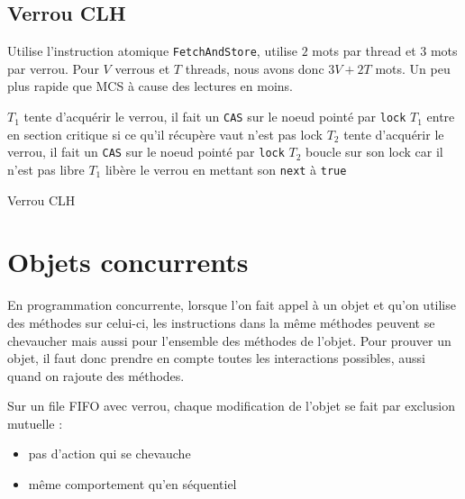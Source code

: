 \documentclass[11pt,a4paper]{report}
\begin{document}

\section{Verrou CLH} %
\label{sec:Verrou CLH}

Utilise l'instruction atomique \texttt{FetchAndStore}, utilise $2$ mots par thread et $3$ mots par verrou. Pour $V$ verrous et $T$ threads, nous avons donc $3V+2T$ mots. Un peu plus rapide que MCS à cause des lectures en moins.

\begin{algorithm}[h] %
    $T_1$ tente d'acquérir le verrou, il fait un \texttt{CAS} sur le noeud pointé par \texttt{lock}\;
    $T_1$ entre en section critique si ce qu'il récupère vaut n'est pas lock\;
    $T_2$ tente d'acquérir le verrou, il fait un \texttt{CAS} sur le noeud pointé par \texttt{lock}\;
    $T_2$ boucle sur son lock car il n'est pas libre\;
    $T_1$ libère le verrou en mettant son \texttt{next} à \texttt{true}\;
    \caption{Verrou CLH}
    \label{algo:verrou-clh}
\end{algorithm} %



\chapter{Objets concurrents} %
\label{cha:Objets concurrents}

En programmation concurrente, lorsque l'on fait appel à un objet et qu'on utilise des méthodes sur celui-ci, les instructions dans la même méthodes peuvent se chevaucher mais aussi pour l'ensemble des méthodes de l'objet. Pour prouver un objet, il faut donc prendre en compte toutes les interactions possibles, aussi quand on rajoute des méthodes.

Sur un file FIFO avec verrou, chaque modification de l'objet se fait par exclusion mutuelle :
\begin{itemize}
    \item pas d'action qui se chevauche
    \item même comportement qu'en séquentiel
\end{itemize}
\end{document}

